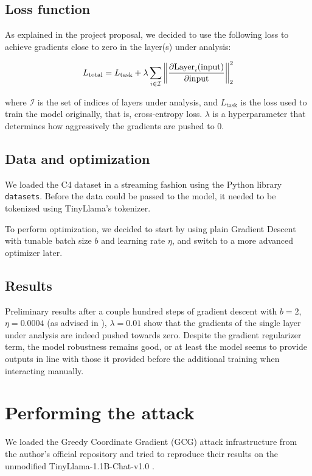 \documentclass[11pt]{article}
\begin{document}
\subsection{Loss function}

As explained in the project proposal, we decided to use the following loss to achieve gradients close to zero in the layer(s) under analysis:

\[ L_{\textrm{total}} = L_{\textrm{task}} + \lambda \sum_{i \in \mathcal{I}} \left\| \pdv{\textrm{Layer}_i(\textrm{input})}{\textrm{input}} \right\|_2^2 \]

where $\mathcal{I}$ is the set of indices of layers under analysis, and $L_{\textrm{task}}$ is the loss used to train the model originally, that is, cross-entropy loss. $\lambda$ is a hyperparameter that determines how aggressively the gradients are pushed to 0.

\subsection{Data and optimization}
\label{sec:dataopt}

We loaded the C4 dataset in a streaming fashion using the Python library \texttt{datasets}. Before the data could be passed to the model, it needed to be tokenized using TinyLlama's tokenizer.

To perform optimization, we decided to start by using plain Gradient Descent with tunable batch size $b$ and learning rate $\eta$, and switch to a more advanced optimizer later.

\subsection{Results}

Preliminary results after a couple hundred steps of gradient descent with $b=2$, $\eta=0.0004$ (as advised in \cite{tinyllamarepo}), $\lambda=0.01$ show that the gradients of the single layer under analysis are indeed pushed towards zero. Despite the gradient regularizer term, the model robustness remains good, or at least the model seems to provide outputs in line with those it provided before the additional training when interacting manually.

\section{Performing the attack}
\label{sec:attack}

We loaded the Greedy Coordinate Gradient (GCG) attack infrastructure from the author's official repository \cite{llmattacksrepo} and tried to reproduce their results on the unmodified TinyLlama-1.1B-Chat-v1.0 \cite{tinyllamahuggingface}.
\end{document}
